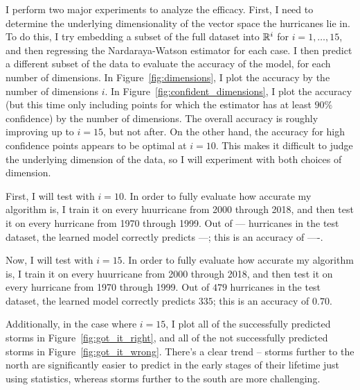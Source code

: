 
\par
I perform two major experiments to analyze the efficacy.
First, I need to determine the underlying dimensionality of the vector space the hurricanes lie in.
To do this, I try embedding a subset of the full dataset into $\mathbb{R}^{i}$ for $i=1,\ldots,15$, and then regressing the Nardaraya-Watson estimator for each case.
I then predict a different subset of the data to evaluate the accuracy of the model, for each number of dimensions.
In Figure~\ref{fig:dimensions}, I plot the accuracy by the number of dimensions $i$.
In Figure~\ref{fig:confident_dimensions}, I plot the accuracy (but this time only including points for which the estimator has at least $90\%$ confidence) by the number of dimensions.
The overall accuracy is roughly improving up to $i=15$, but not after.
On the other hand, the accuracy for high confidence points appears to be optimal at $i=10$.
This makes it difficult to judge the underlying dimension of the data, so I will experiment with both choices of dimension.

\begin{figure*}
	\centering
	\caption{A plot of all hurricanes successfully predicted by the dimension-$15$ model.}
	\label{fig:got_it_right}
\end{figure*}

\begin{figure*}
	\centering
	\caption{A plot of all hurricanes not successfully predicted by the dimension-$15$ model.}
	\label{fig:got_it_wrong}
\end{figure*}

\par
First, I will test with $i=10$.
In order to fully evaluate how accurate my algorithm is, I train it on every huurricane from 2000 through 2018, and then test it on every hurricane from 1970 through 1999.
Out of --- hurricanes in the test dataset, the learned model correctly predicts ---; this is an accuracy of ----.

\par
Now, I will test with $i=15$.
In order to fully evaluate how accurate my algorithm is, I train it on every huurricane from 2000 through 2018, and then test it on every hurricane from 1970 through 1999.
Out of $479$ hurricanes in the test dataset, the learned model correctly predicts $335$; this is an accuracy of $0.70$.

\par
Additionally, in the case where $i=15$, I plot all of the successfully predicted storms in Figure~\ref{fig:got_it_right}, and all of the not successfully predicted storms in Figure~\ref{fig:got_it_wrong}.
There's a clear trend -- storms further to the north are significantly easier to predict in the early stages of their lifetime just using statistics, whereas storms further to the south are more challenging.